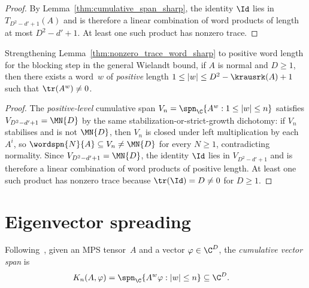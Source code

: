 \begin{proof}
    \leanok
    By Lemma~\ref{thm:cumulative_span_sharp}, the identity $\Id$ lies in
    $T_{D^2-d'+1}(A)$ and is therefore a linear combination of word
    products of length at most $D^2-d'+1$.
    At least one such product has nonzero trace.
\end{proof}

\begin{lemma}%
    \label{thm:nonzero_trace_word_sharp_pos}
    \leanok
    Strengthening Lemma~\ref{thm:nonzero_trace_word_sharp} to positive word
    length for the blocking step in the general Wielandt bound, if $A$ is
    normal and $D\ge1$, then there exists a word~$w$ of \emph{positive} length
    $1\le|w|\le D^2-\krausrk(A)+1$ such that $\tr(A^w)\neq0$.
\end{lemma}

\begin{proof}
    \leanok
    The \emph{positive-level} cumulative span
    $V_n=\spn_{\C}\{A^w:1\le|w|\le n\}$ satisfies $V_{D^2-d'+1}=\MN{D}$ by
    the same stabilization-or-strict-growth dichotomy: if $V_n$ stabilises and is not $\MN{D}$, then
    $V_n$ is closed under left multiplication by each $A^i$, so
    $\wordspn{N}{A}\subseteq V_n\neq\MN{D}$ for every $N\ge1$,
    contradicting normality.
    Since $V_{D^2-d'+1}=\MN{D}$, the identity $\Id$ lies in
    $V_{D^2-d'+1}$ and is therefore a linear combination of word products
    of positive length. At least one such product has nonzero trace because
    $\tr(\Id)=D\neq0$ for $D\ge1$.
\end{proof}

\section{Eigenvector spreading}

\begin{definition}\label{def:cumulative_vector_span}
    \leanok
    Following~\cite[proof of Lemma~2(a)]{Sanz2010Quantum}, given an MPS
    tensor~$A$ and a vector $\varphi\in\C^D$, the \emph{cumulative vector span}
    is
    \begin{align}
        K_n(A,\varphi)
         & =\spn_{\C}\{A^w\varphi:|w|\le n\}\subseteq\C^D.
        \notag
    \end{align}
\end{definition}

